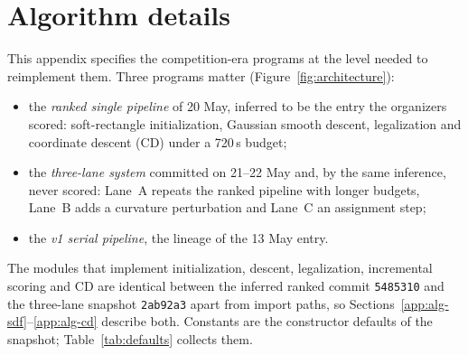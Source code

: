 \section{Algorithm details}\label{app:algorithms}

This appendix specifies the competition-era programs at the level needed to
reimplement them. Three programs matter (Figure~\ref{fig:architecture}):
\begin{itemize}
  \item the \emph{ranked single pipeline} of 20 May, inferred to be the entry the
        organizers scored: soft-rectangle initialization, Gaussian smooth descent,
        legalization and coordinate descent (CD) under a 720\,s budget;
  \item the \emph{three-lane system} committed on 21--22 May and, by the same
        inference, never scored:
        Lane~A repeats the ranked pipeline with longer budgets, Lane~B adds a
        curvature perturbation and Lane~C an assignment step;
  \item the \emph{v1 serial pipeline}, the lineage of the 13 May entry.
\end{itemize}
The modules that implement initialization, descent, legalization, incremental
scoring and CD are identical between the inferred ranked commit \texttt{5485310}
and the three-lane snapshot \texttt{2ab92a3} apart from import paths, so
Sections~\ref{app:alg-sdf}--\ref{app:alg-cd} describe both. Constants are the
constructor defaults of the snapshot; Table~\ref{tab:defaults} collects them.

